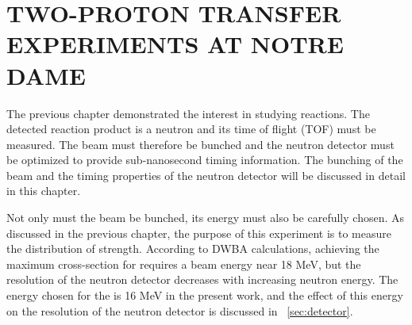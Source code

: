 %
%
%
%
%
%
%
%

%
%

\chapter{TWO-PROTON TRANSFER EXPERIMENTS AT NOTRE DAME}
\label{chap:2pExpt}

The previous chapter demonstrated the interest in studying \reaction reactions.  The detected reaction product is a neutron and its time of flight (TOF) must be measured.  The beam must therefore be bunched and the neutron detector must be optimized to provide sub-nanosecond timing information.  The bunching of the beam and the timing properties of the neutron detector will be discussed in detail in this chapter.   


Not only must the beam be bunched, its energy must also be carefully chosen.  As discussed in the previous chapter, the purpose of this experiment is to measure the distribution of \zp strength.  According to DWBA calculations, achieving the maximum \zp cross-section for \reaction requires a beam energy near 18 MeV, but the resolution of the neutron detector decreases with increasing neutron energy.  The energy chosen for the  is 16 MeV in the present work, and the effect of this energy on the resolution of the neutron detector is discussed in {\sect}~\ref{sec:detector}.


